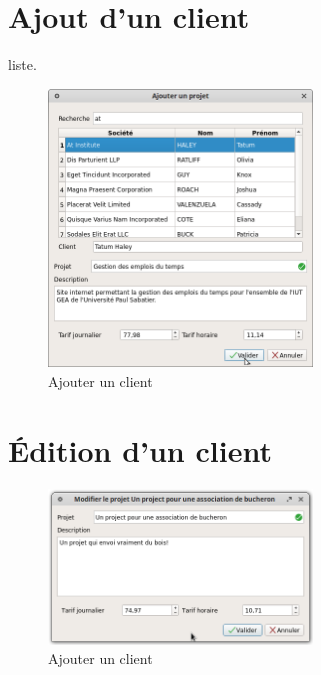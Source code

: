 \section{Ajout d'un client}
liste. 
\begin{figure}[H]
	\centering
	\includegraphics[width=7cm]{screens/ajouterProjet.png}
	\caption{Ajouter un client}
\end{figure}

\section{Édition d'un client}
\begin{figure}[H]
	\centering
	\includegraphics[width=7cm]{screens/editerProjet.png}
	\caption{Ajouter un client}
\end{figure}